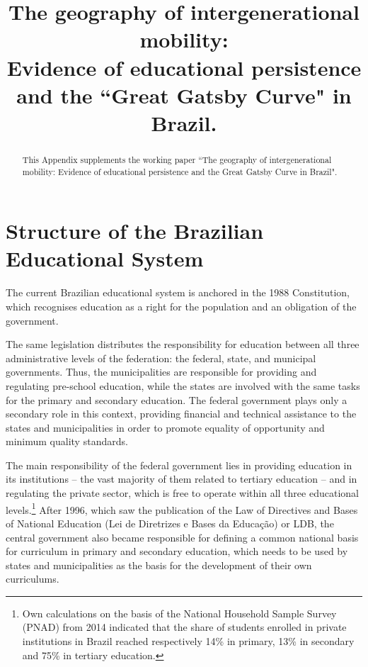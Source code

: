 \documentclass[a4paper, 12pt]{article}
\title{The geography of intergenerational mobility: \\ \small  Evidence of educational persistence and the ``Great Gatsby Curve" in Brazil.}
\begin{document}
\begin{titlingpage}
\maketitle

\begin{abstract}
This Appendix supplements the working paper ``The geography of intergenerational mobility: Evidence of educational persistence and the Great Gatsby Curve in Brazil". 

\end{abstract}

\end{titlingpage}

\newpage

\tableofcontents
\newpage


\setcounter{table}{0}
\renewcommand{\thetable}{A\arabic{table}}
\setcounter{figure}{0}
\renewcommand{\thefigure}{A\arabic{figure}}


\section{Structure of the Brazilian Educational System}
\label{appendix:EducationSystem}


The current Brazilian educational system is anchored in the 1988 Constitution, which recognises education as a right for the population and an obligation of the government. 

The same legislation distributes the responsibility for education between all three administrative levels of the federation: the federal, state, and municipal governments. Thus, the municipalities are responsible for providing and regulating pre-school education, while the states are involved with the same tasks for the primary and secondary education. The federal government plays only a secondary role in this context, providing financial and technical assistance to the states and municipalities in order to promote equality of opportunity and minimum quality standards.

The main responsibility of the federal government lies in providing education in its institutions – the vast majority of them related to tertiary education – and in regulating the private sector, which is free to operate within all three educational levels.\footnote{Own calculations on the basis of the National Household Sample Survey (PNAD) from 2014 indicated that the share of students enrolled in private institutions in Brazil reached respectively 14\% in primary, 13\% in secondary and 75\% in tertiary education.} After 1996, which saw the publication of the Law of Directives and Bases of National Education (Lei de Diretrizes e Bases da Educação) or LDB, the central government also became responsible for defining a common national basis for curriculum in primary and secondary education, which needs to be used by states and municipalities as the basis for the development of their own curriculums.
\end{document}
